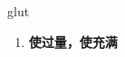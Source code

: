 
\begin{frame}
{\huge glut}
\begin{center}
\begin{enumerate}\Large
  \item \textbf{使过量，使充满}
\end{enumerate}
\end{center}
\end{frame}
